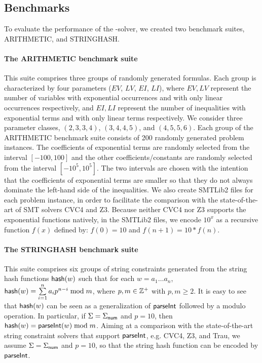 \subsection{Benchmarks}

To evaluate the performance of the {\paexp}-solver, we created two benchmark suites, ARITHMETIC, and STRINGHASH.

\paragraph{The ARITHMETIC benchmark suite} 
This suite comprises three groups of randomly generated {\paexp} formulas. Each group is characterized by four parameters ($EV$, $LV$, $EI$, $LI$), where $EV, LV$ represent the number of variables with exponential occurrences and with only linear occurrences respectively, and $EI, LI$ represent the number of inequalities with exponential terms and with only linear terms respectively. 
We consider three parameter classes, $(2, 3, 3, 4)$, $(3, 4, 4, 5)$, and $(4, 5, 5, 6)$. 
Each group of the ARITHMETIC benchmark suite consists of 200 randomly generated problem instances. The coefficients of exponential terms are randomly selected from the interval $[-100, 100]$ and the other coefficients/constants are randomly selected from the interval $[-10^5, 10^5]$. The two intervals are chosen with the intention that the coefficients of exponential terms are smaller so that they do not always dominate the left-hand side of the inequalities. We also create SMTLib2 files for each problem instance, in order to facilitate the comparison with the state-of-the-art of SMT solvers CVC4 and Z3. Because neither CVC4 nor Z3 supports the exponential functions natively, in the SMTLib2 files, we encode $10^x$ as a recursive function $f(x)$ defined by: $f(0) = 10$ and $f(n+1) = 10*f(n)$.

%

\paragraph{The STRINGHASH benchmark suite} 
This suite comprises six groups of string constraints generated from the string hash functions ${\sf hash}(w)$ such that for each $w= a_1 \ldots a_n$, 
${\sf hash}(w) = \sum \limits_{i = 1}^n a_i p^{n-i} \bmod m$, where $p, m \in \mathbb{Z}^+$ with $p, m \ge 2$. It is easy to see that ${\sf hash}(w)$ can be seen as a generalization of $\textsf{parseInt}$ followed by a modulo operation. In particular, if $\Sigma = \Sigma_{\sf num}$ and $p = 10$, then ${\sf hash}(w) = \textsf{parseInt}(w) \bmod m$. 
Aiming at a comparison with the state-of-the-art string constraint solvers that support $\textsf{parseInt}$, e.g. CVC4, Z3, and Trau, we assume $\Sigma =\Sigma_{\sf num}$ and $p = 10$, so that the string hash function can be encoded by $\textsf{parseInt}$. 

